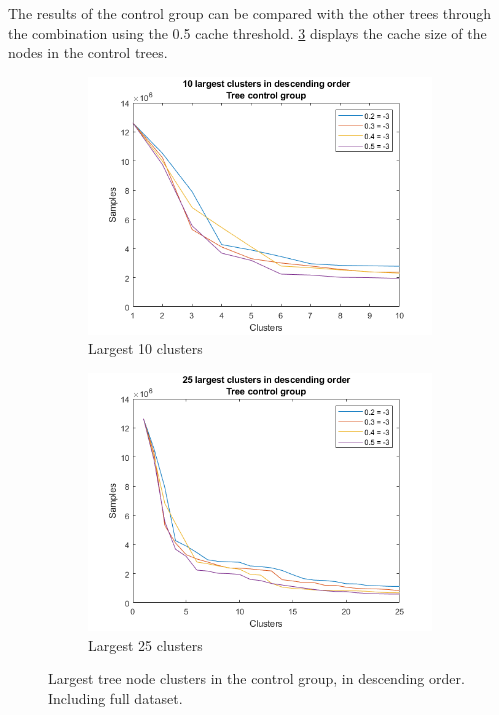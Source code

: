 The results of the control group can be compared with the other trees through the combination using the 0.5 cache threshold.
\cref{fig:tree:treecontrolcluster} displays the cache size of the nodes in the control trees.

\begin{figure}
    \centering
    \begin{subfigure}[b]{.45\textwidth}
        \centering
        \includegraphics[width=\textwidth]{figures/treecontrolcluster10.png}
        \caption{Largest 10 clusters}
        \label{sfig:tree:treecontrolcluster10}
    \end{subfigure}
    \hfill
    \begin{subfigure}[b]{.45\textwidth}
        \centering
        \includegraphics[width=\textwidth]{figures/treecontrolcluster25.png}
        \caption{Largest 25 clusters}
        \label{sfig:tree:treecontrolcluster25}
    \end{subfigure}
    \caption{Largest tree node clusters in the control group, in descending order. Including full dataset.}
    \label{fig:tree:treecontrolcluster}
\end{figure}

